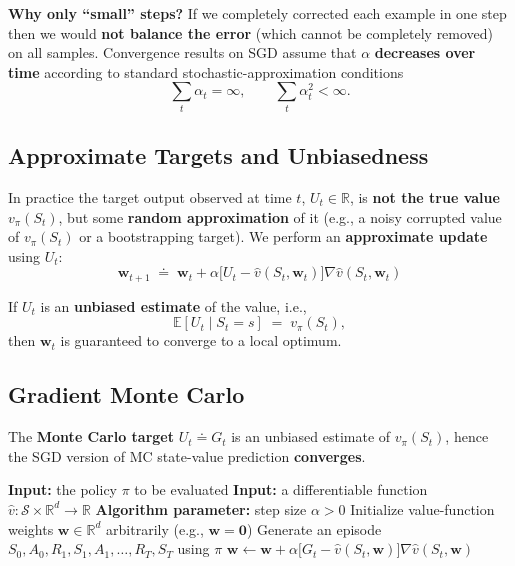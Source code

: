 \documentclass[11pt,a4paper]{article}
\theoremstyle{definition}
\theoremstyle{plain}
\theoremstyle{remark}
\begin{document}
\textbf{Why only ``small'' steps?} If we completely corrected each example in one step then we would \textbf{not balance the error} (which cannot be completely removed) on all samples. Convergence results on SGD assume that $\alpha$ \textbf{decreases over time} according to standard stochastic-approximation conditions
\[
    \sum_t \alpha_t = \infty, \qquad \sum_t \alpha_t^2 < \infty.
\]

\subsection{Approximate Targets and Unbiasedness}

In practice the target output observed at time $t$, $U_t \in \mathbb{R}$, is \textbf{not the true value} $v_\pi(S_t)$, but some \textbf{random approximation} of it (e.g., a noisy corrupted value of $v_\pi(S_t)$ or a bootstrapping target). We perform an \textbf{approximate update} using $U_t$:
\[
    \boxed{\;\mathbf{w}_{t+1} \;\doteq\; \mathbf{w}_t + \alpha \bigl[U_t - \hat{v}(S_t, \mathbf{w}_t)\bigr] \nabla \hat{v}(S_t, \mathbf{w}_t)\;}
\]

\begin{tcolorbox}[colback=green!5!white, colframe=green!60!black, title={Convergence Condition}]
If $U_t$ is an \textbf{unbiased estimate} of the value, i.e.,
\[
    \mathbb{E}[U_t \mid S_t = s] \;=\; v_\pi(S_t),
\]
then $\mathbf{w}_t$ is guaranteed to converge to a local optimum.
\end{tcolorbox}

\subsection{Gradient Monte Carlo}

The \textbf{Monte Carlo target} $U_t \doteq G_t$ is an unbiased estimate of $v_\pi(S_t)$, hence the SGD version of MC state-value prediction \textbf{converges}.

\begin{algorithm}[H]
\caption{Gradient Monte Carlo Algorithm for Estimating $\hat{v} \approx v_\pi$}
\begin{algorithmic}
\STATE \textbf{Input:} the policy $\pi$ to be evaluated
\STATE \textbf{Input:} a differentiable function $\hat{v} : \mathcal{S} \times \mathbb{R}^d \to \mathbb{R}$
\STATE \textbf{Algorithm parameter:} step size $\alpha > 0$
\STATE Initialize value-function weights $\mathbf{w} \in \mathbb{R}^d$ arbitrarily (e.g., $\mathbf{w} = \mathbf{0}$)
    \STATE Generate an episode $S_0, A_0, R_1, S_1, A_1, \ldots, R_T, S_T$ using $\pi$
        \STATE $\mathbf{w} \leftarrow \mathbf{w} + \alpha \bigl[G_t - \hat{v}(S_t, \mathbf{w})\bigr] \nabla \hat{v}(S_t, \mathbf{w})$
    \ENDFOR
\ENDFOR
\end{algorithmic}
\end{algorithm}
\end{document}
